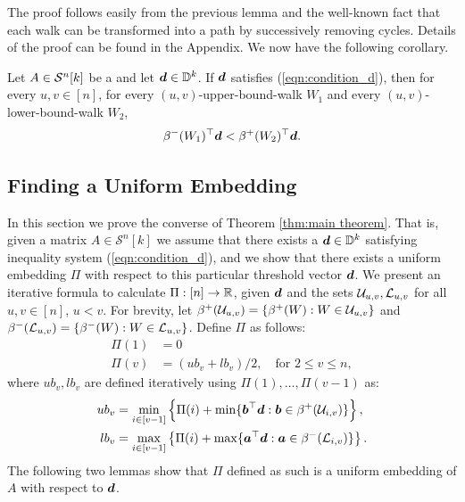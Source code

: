 \documentclass[runningheads]{llncs}
\begin{document}
The proof follows easily from the previous lemma and the well-known fact that each walk can be transformed into a path by successively removing cycles. Details of the proof can be found in the Appendix. We now have the following corollary.

\begin{corollary}
Let $A\in\mathcal S^n[k]$  be a \diagincmat{} and let $\boldsymbol d\in\mathbb D^k$. If $\boldsymbol d$ satisfies (\ref{eqn:condition_d}), then for every $u,v\in [n]$, for every $(u,v)$-upper-bound-walk $W_1$ and every $(u,v)$-lower-bound-walk $W_2$,
\begin{equation*}
 \beta^-(W_1)^\top \boldsymbol d<\beta^+(W_2)^\top\boldsymbol d.
\end{equation*}
\end{corollary}




%


\subsection{Finding a Uniform Embedding}
In this section we prove the converse of Theorem \ref{thm:main theorem}. That is, given a matrix $A\in \mathcal{S}^n[k]$ we assume that there exists a $\boldsymbol d\in\mathbb D^k$ satisfying inequality system (\ref{eqn:condition_d}), and we show that there exists a uniform embedding $\Pi$ with respect to this particular threshold vector $\boldsymbol d$.
We present an iterative formula to calculate $\Pi:[n]\rightarrow \mathbb R$, given $\boldsymbol d$ and the sets $\mathcal{U}_{u,v}, \mathcal{L}_{u,v}$ for all $u,v\in [n]$, $u<v$. For brevity, let $\beta^+({\mathcal{U}}_{u, v})= \{\beta^+(W):W\in\mathcal{U}_{u,v}\}$ and  $\beta^-({\mathcal{L}}_{u, v})= \{\beta^-(W):W\in\mathcal{L}_{u,v}\}$. Define $\Pi$  as follows:
\begin{equation}\label{alg:embedding algorithm}
    \begin{array}{rl}
     \Pi(1)&= 0  \\
     \Pi(v)&= (ub_v+lb_v)/2, \quad\text{for }2\leq v\leq n, 
\end{array}
\end{equation}
where $ub_v, lb_v$ are defined iteratively using $\Pi(1),\dots ,\Pi(v-1)$ as:
\begin{equation}\label{equi:ubv and lbv}\begin{split}
    ub_v & = \min_{i\in[v-1]}\left\{ \Pi(i)+ \min\{\bmb^\top\bmd: \bmb\in\upperbd iv\} \right\},\\ %
    lb_v & = \max_{i\in[v-1]}\left\{ \Pi(i)+ \max\{\bma^\top\bmd: \bma\in\lowerbd iv\} \right\}.
\end{split}\end{equation}
The following two lemmas show that $\Pi$ defined as such is a uniform embedding of $A$ with respect to $\boldsymbol d$.
\end{document}
